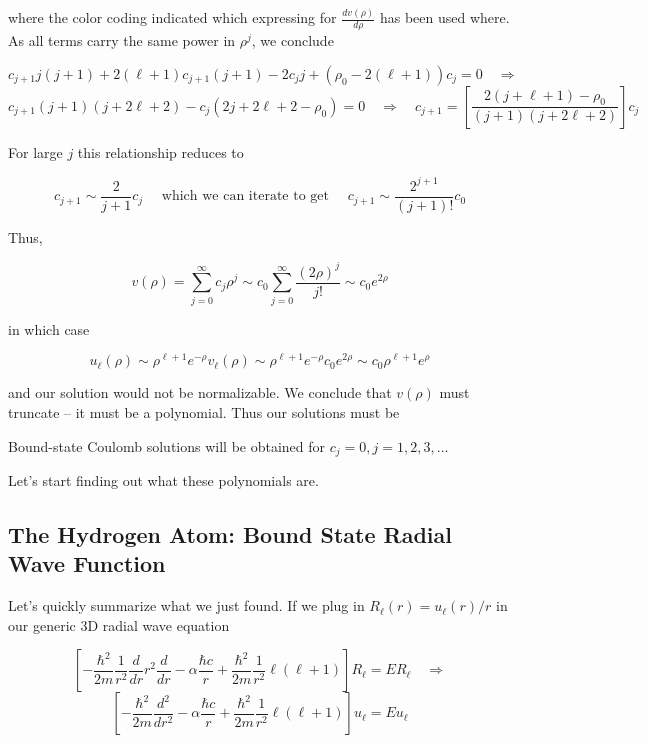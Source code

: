 where the color coding indicated which expressing for $ \frac{d v(\rho)}{d
\rho}$ has been used where. As all terms carry the same power in $\rho^j$, we
conclude 

\[c_{j+1} j(j+1) + 2(\ell +1) c_{j+1} (j+1) - 2c_j j + (\rho_0 - 2(\ell +1))c_j
= 0\quad \Rightarrow \] 
\[ c_{j+1} (j+1)(j+2\ell +2) - c_j (2j + 2\ell + 2 - \rho_0) = 0 \quad
  \Rightarrow \quad c_{j+1} = \left[ \frac{2(j+\ell +1) - \rho_0}{(j+1)(j+2\ell + 2)}
  \right] c_j \] \vspace{3px}


For large $j$ this relationship reduces to 

\[
  c_{j+1} \sim \frac{2}{j+1}c_j \quad \text{ which we can iterate to get
  } \quad c_{j+1}
  \sim \frac{2^{j+1}}{(j+1)!}c_0
\] \vspace{3px}

Thus, 

\[
v(\rho) = \sum_{j=0}^{\infty} c_j \rho^j \sim c_0 \sum_{j=0}^{\infty}
\frac{(2\rho)^j}{j!} \sim c_0 e^{2\rho}
\] \vspace{3px}

in which case 

\[
  u_\ell (\rho) \sim \rho^{\ell +1} e^{-\rho} v_\ell (\rho) \sim \rho^{\ell +1}
  e^{-\rho} c_0 e^{2\rho} \sim c_0 \rho^{\ell +1} e^{\rho}
\] \vspace{3px}

and our solution would not be normalizable. We conclude that $v(\rho)$ must
truncate -- it must be a polynomial. Thus our solutions must be 

\begin{subbox}{}
  Bound-state Coulomb solutions will be obtained for $c_j = 0, j = 1, 2, 3,
  \hdots$
\end{subbox}

Let's start finding out what these polynomials are. 


\subsection{The Hydrogen Atom: Bound State Radial Wave Function}

Let's quickly summarize what we just found. If we plug in $R_\ell (r) = u_\ell
(r) / r$ in our generic 3D radial wave equation 

\[\left[ -\frac{\hbar^2}{2m} \frac{1}{r^2} \frac{d }{d r} r^2 \frac{d }{d r} - \alpha
\frac{\hbar c}{r} + \frac{\hbar^2}{2m} \frac{1}{r^2} \ell (\ell +1) \right]
R_\ell = ER_\ell  \quad \Rightarrow \] 
\[\left[ -\frac{\hbar^2}{2m}  \frac{d^2 }{d r^2} - \alpha \frac{\hbar c}{r}
  + \frac{\hbar^2}{2m} \frac{1}{r^2} \ell (\ell +1) \right] u_\ell = Eu_\ell
\] \vspace{3px}


